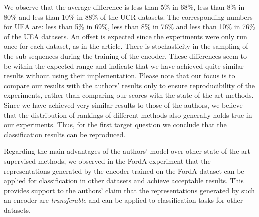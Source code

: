 \documentclass{article}
\begin{document}
We observe that the average difference is less than 5\% in 68\%, less than 8\% in 80\% and less than 10\% in 88\% of the UCR datasets. The corresponding numbers for UEA are: less than 5\% in 69\%, less than 8\% in 76\% and less than 10\% in 76\% of the UEA datasets. An offset is expected since the experiments were only run once for each dataset, as in the article. There is stochasticity in the sampling of the sub-sequences during the training of the encoder.
These differences seem to be within the expected range and indicate that we have achieved quite similar results without using their implementation. Please note that our focus is to compare our results with the authors' results only to ensure reproducibility of the experiments, rather than comparing our scores with the state-of-the-art methods. Since we have achieved very similar results to those of the authors, we believe that the distribution of rankings of different methods also generally holds true in our experiments. Thus, for the first target question we conclude that the classification results can be reproduced.

Regarding the main advantages of the authors' model over other state-of-the-art supervised methods, we observed in the FordA experiment that the representations generated by the encoder trained on the FordA dataset can be applied for classification in other datasets and achieve acceptable results. This provides support to the authors' claim that the representations generated by such an encoder are %
\textit{transferable} and can be applied to classification tasks for other datasets.
\end{document}
